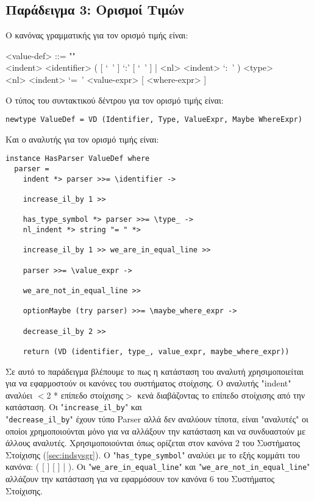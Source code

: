 \documentclass[diploma]{softlab-thesis}
\begin{document}
\newpage

\subsection{Παράδειγμα 3: Ορισμοί Τιμών}

Ο κανόνας γραμματικής για τον ορισμό τιμής είναι:
\begin{grammar}
<value-def> ::= ""\\
<indent> <identifier>
( [ `\ ' ] `:' [ `\ ' ] | <nl> <indent> `:\ ' ) <type>  \\
<nl> <indent> `=\ ' <value-expr> [ <where-expr> ]
\\
\end{grammar}
Ο τύπος του συντακτικού δέντρου για τον ορισμό τιμής είναι:
\begin{verbatim}
newtype ValueDef = VD (Identifier, Type, ValueExpr, Maybe WhereExpr)

\end{verbatim}
Και ο αναλυτής για τον ορισμό τιμής είναι:
\begin{verbatim}
instance HasParser ValueDef where
  parser =
    indent *> parser >>= \identifier ->

    increase_il_by 1 >>

    has_type_symbol *> parser >>= \type_ ->
    nl_indent *> string "= " *>

    increase_il_by 1 >> we_are_in_equal_line >>

    parser >>= \value_expr ->

    we_are_not_in_equal_line >>

    optionMaybe (try parser) >>= \maybe_where_expr ->

    decrease_il_by 2 >>

    return (VD (identifier, type_, value_expr, maybe_where_expr))

\end{verbatim}
Σε αυτό το παράδειγμα βλέπουμε το πως η κατάσταση του αναλυτή χρησιμοποιείται
για να εφαρμοστούν οι κανόνες του συστήματος στοίχισης. Ο αναλυτής "indent"
αναλύει $<$2 * επίπεδο στοίχισης$>$ κενά διαβάζοντας το επίπεδο στοίχισης από
την κατάσταση. Oι "\verb|increase_il_by|" και \\"\verb|decrease_il_by|" έχουν
τύπο Parser αλλά δεν αναλύουν τίποτα, είναι "αναλυτές" οι οποίοι χρημοποιούνται
μόνο για να αλλάξουν την κατάσταση και να συνδυαστούν με άλλους αναλυτές.
Χρησιμοποιούνται όπως ορίζεται στον κανόνα 2 του Συστήματος Στοίχισης
(\ref{sec:indsysgr}). Ο "\verb|has_type_symbol|" αναλύει με το εξής κομμάτι του
κανόνα: ( [ \lit{\ } ] \lit{:} [ \lit{\ } ] \verb|||  
\lit{:\ }). Οι "\verb|we_are_in_equal_line|" και
"\verb|we_are_not_in_equal_line|" αλλάζουν την κατάσταση για να εφαρμόσουν τον
κανόνα 6 του Συστήματος Στοίχισης.
\end{document}

